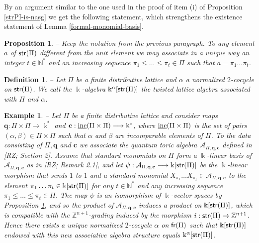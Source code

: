 \documentclass[twoside,11pt]{article}
\renewcommand{\k}{\Bbbk}
\newcommand{\N}{{\mathbb N}}
\newcommand{\Z}{{\mathbb Z}}
\newcommand{\A}{{\mathcal A}}
\renewcommand{\c}{{\mathbf c}}
\newcommand{\q}{{\mathbf q}}
\newcommand{\FrMon}{{\sf fr}}
\newcommand{\StMon}{{\sf str}}
\newcommand{\inc}{\underline{{\rm inc}}}
\newtheorem{subproposition}[subtheorem]{Proposition}
\newtheorem{subdefinition}[subtheorem]{Definition}
\newtheorem{subexample}[subtheorem]{Example}
\begin{document}
By an argument similar to the one used in the proof of item (i) of Proposition
\ref{strPI-is-nasg} we get the following statement, which strengthens the existence
statement of Lemma \ref{formal-monomial-basis}.

\begin{subproposition} -- \label{base-pour-alg-str} Keep the notation from the previous
	paragraph. To any element $a$ of $\StMon(\Pi)$ different from the unit element we
	may associate in a unique way an integer $t \in\N^*$ and an increasing sequence
	$\pi_1 \le \dots \le \pi_t \in\Pi$ such that $a=\pi_1\dots\pi_t$.
\end{subproposition}

\begin{subdefinition} -- 
Let $\Pi$ be a finite distributive lattice and $\alpha$ a normalized $2$-cocycle on
$\StMon(\Pi)$. We call the $\k$-algebra $\k^\alpha[\StMon(\Pi)]$  the twisted lattice
algebra associated with $\Pi$ and $\alpha$.
\end{subdefinition}

\begin{subexample} -- \label{qta-sont-qla} \rm
Let $\Pi$ be a finite distributive lattice and consider maps $\q : \Pi \times \Pi
\longrightarrow \k^*$ and $\c : \inc(\Pi \times \Pi) \longrightarrow \k^*$, where
$\inc(\Pi\times\Pi)$ is the set of pairs $(\alpha,\beta)\in\Pi\times\Pi$ such that
$\alpha$ and $\beta$ are incomparable elements of $\Pi$. To the data consisting of
$\Pi,\q$ and $\c$ we associate the {\em quantum toric algebra} $\A_{\Pi,\q,\c}$ defined
in [RZ; Section 2]. Assume that standard monomials on $\Pi$ form a $\k$-linear basis
of $\A_{\Pi,\q,\c}$ as in [RZ; Remark 2.1], and let $\psi: \A_{\Pi,\q,\c} \longrightarrow
\k[\StMon(\Pi)]$ be the $\k$-linear morphism that sends $1$ to $1$ and a standard
monomial $X_{\pi_1} \dots X_{\pi_t} \in \A_{\Pi,\q,\c}$ to the element $\pi_1 \dots \pi_t
\in \k[\StMon(\Pi)]$ for any $t\in\N^*$ and any increasing sequence $\pi_1 \le\dots\le
\pi_t \in\Pi$. The map $\psi$ is an isomorphism of $\k$-vector spaces by Proposition
\ref{base-pour-alg-str}, and so the product of $\A_{\Pi,\q,\c}$ induces a product on
$\k[\StMon(\Pi)]$, which is compatible with the $\Z^{n+1}$-grading induced by
the morphism $i: \StMon(\Pi) \to \Z^{n+1}$. Hence there exists a unique normalized
$2$-cocycle $\alpha$ on $\FrMon(\Pi)$ such that $\k[\StMon(\Pi)]$ endowed with this new
associative algebra structure equals $\k^\alpha[\StMon(\Pi)]$.
\end{subexample}
\end{document}
